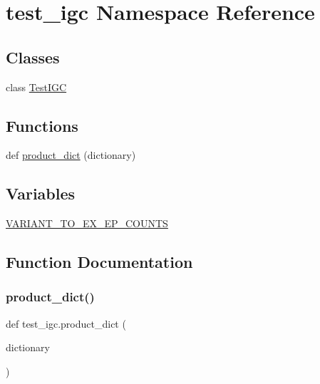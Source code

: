 \hypertarget{namespacetest__igc}{}\section{test\+\_\+igc Namespace Reference}
\label{namespacetest__igc}
\subsection*{Classes}
\begin{DoxyCompactItemize}
\item 
class \hyperlink{classtest__igc_1_1TestIGC}{Test\+I\+GC}
\end{DoxyCompactItemize}
\subsection*{Functions}
\begin{DoxyCompactItemize}
\item 
def \hyperlink{namespacetest__igc_a8bd3155f9accc82ab841ba66f2bbfae0}{product\+\_\+dict} (dictionary)
\end{DoxyCompactItemize}
\subsection*{Variables}
\begin{DoxyCompactItemize}
\item 
\hyperlink{namespacetest__igc_aeef6b39d3c9b65fdbd80f2feea7bf0c0}{V\+A\+R\+I\+A\+N\+T\+\_\+\+T\+O\+\_\+\+E\+X\+\_\+\+E\+P\+\_\+\+C\+O\+U\+N\+TS}
\end{DoxyCompactItemize}


\subsection{Function Documentation}
\mbox{\label{namespacetest__igc_a8bd3155f9accc82ab841ba66f2bbfae0}} 
\subsubsection{\texorpdfstring{product\+\_\+dict()}{product\_dict()}}
{\footnotesize\ttfamily def test\+\_\+igc.\+product\+\_\+dict (\begin{DoxyParamCaption}\item[{}]{dictionary }\end{DoxyParamCaption})}



